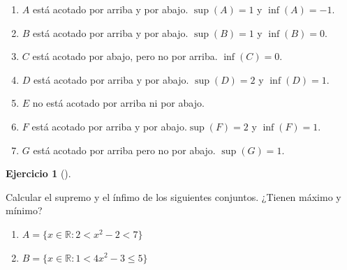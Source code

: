 \documentclass[
  a4paper,
]{scrreport}
\providecommand{\tightlist}{%
  \setlength{\itemsep}{0pt}\setlength{\parskip}{0pt}}\usepackage{longtable,booktabs,array}
\theoremstyle{definition}
\newtheorem{exercise}{Ejercicio}[chapter]
\theoremstyle{remark}
\begin{document}
\begin{tcolorbox}[enhanced jigsaw, colbacktitle=quarto-callout-tip-color!10!white, coltitle=black, arc=.35mm, opacityback=0, breakable, colback=white, bottomtitle=1mm, opacitybacktitle=0.6, rightrule=.15mm, colframe=quarto-callout-tip-color-frame, title=\textcolor{quarto-callout-tip-color}{\faLightbulb}\hspace{0.5em}{Solución}, toptitle=1mm, titlerule=0mm, bottomrule=.15mm, left=2mm, leftrule=.75mm, toprule=.15mm]

\begin{enumerate}
\def\labelenumi{\alph{enumi}.}
\item
  \(A\) está acotado por arriba y por abajo. \(\sup(A)=1\) y
  \(\inf(A)=-1\).
\item
  \(B\) está acotado por arriba y por abajo. \(\sup(B)=1\) y
  \(\inf(B)=0\).
\item
  \(C\) está acotado por abajo, pero no por arriba. \(\inf(C)=0\).
\item
  \(D\) está acotado por arriba y por abajo. \(\sup(D)=2\) y
  \(\inf(D)=1\).
\item
  \(E\) no está acotado por arriba ni por abajo.
\item
  \(F\) está acotado por arriba y por abajo.\(\sup(F)=2\) y
  \(\inf(F)=1\).
\item
  \(G\) está acotado por arriba pero no por abajo. \(\sup(G)=1\).
\end{enumerate}

\end{tcolorbox}

\leavevmode{}%
\begin{exercise}[]\label{exr-supremo-infimo-maximo-minimo-2}

Calcular el supremo y el ínfimo de los siguientes conjuntos. ¿Tienen
máximo y mínimo?

\begin{enumerate}
\def\labelenumi{\alph{enumi}.}
\tightlist
\item
  \(A=\{x\in \mathbb{R} : 2 < x^2-2 < 7\}\)
\item
  \(B=\{x\in \mathbb{R} : 1 < 4x^2 - 3 \leq 5\}\)
\end{enumerate}

\end{exercise}
\end{document}
